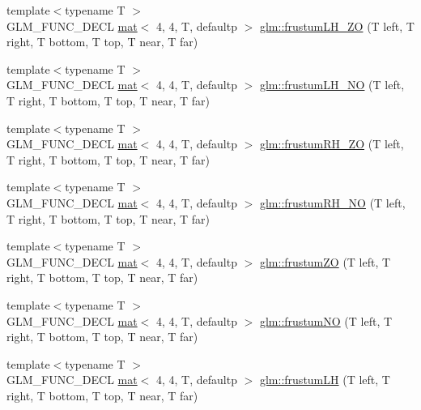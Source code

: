 \begin{DoxyCompactItemize}
\item 
{\footnotesize template$<$typename T $>$ }\\G\+L\+M\+\_\+\+F\+U\+N\+C\+\_\+\+D\+E\+CL \hyperlink{structglm_1_1mat}{mat}$<$ 4, 4, T, defaultp $>$ \hyperlink{group__gtc__matrix__transform_ga94218b094862d17798370242680b9030}{glm\+::frustum\+L\+H\+\_\+\+ZO} (T left, T right, T bottom, T top, T near, T far)
\item 
{\footnotesize template$<$typename T $>$ }\\G\+L\+M\+\_\+\+F\+U\+N\+C\+\_\+\+D\+E\+CL \hyperlink{structglm_1_1mat}{mat}$<$ 4, 4, T, defaultp $>$ \hyperlink{group__gtc__matrix__transform_ga259520cad03b3f8bca9417920035ed01}{glm\+::frustum\+L\+H\+\_\+\+NO} (T left, T right, T bottom, T top, T near, T far)
\item 
{\footnotesize template$<$typename T $>$ }\\G\+L\+M\+\_\+\+F\+U\+N\+C\+\_\+\+D\+E\+CL \hyperlink{structglm_1_1mat}{mat}$<$ 4, 4, T, defaultp $>$ \hyperlink{group__gtc__matrix__transform_ga7654a9227f14d5382786b9fc0eb5692d}{glm\+::frustum\+R\+H\+\_\+\+ZO} (T left, T right, T bottom, T top, T near, T far)
\item 
{\footnotesize template$<$typename T $>$ }\\G\+L\+M\+\_\+\+F\+U\+N\+C\+\_\+\+D\+E\+CL \hyperlink{structglm_1_1mat}{mat}$<$ 4, 4, T, defaultp $>$ \hyperlink{group__gtc__matrix__transform_ga9236c8439f21be186b79c97b588836b9}{glm\+::frustum\+R\+H\+\_\+\+NO} (T left, T right, T bottom, T top, T near, T far)
\item 
{\footnotesize template$<$typename T $>$ }\\G\+L\+M\+\_\+\+F\+U\+N\+C\+\_\+\+D\+E\+CL \hyperlink{structglm_1_1mat}{mat}$<$ 4, 4, T, defaultp $>$ \hyperlink{group__gtc__matrix__transform_gaa73322e152edf50cf30a6edac342a757}{glm\+::frustum\+ZO} (T left, T right, T bottom, T top, T near, T far)
\item 
{\footnotesize template$<$typename T $>$ }\\G\+L\+M\+\_\+\+F\+U\+N\+C\+\_\+\+D\+E\+CL \hyperlink{structglm_1_1mat}{mat}$<$ 4, 4, T, defaultp $>$ \hyperlink{group__gtc__matrix__transform_gae34ec664ad44860bf4b5ba631f0e0e90}{glm\+::frustum\+NO} (T left, T right, T bottom, T top, T near, T far)
\item 
{\footnotesize template$<$typename T $>$ }\\G\+L\+M\+\_\+\+F\+U\+N\+C\+\_\+\+D\+E\+CL \hyperlink{structglm_1_1mat}{mat}$<$ 4, 4, T, defaultp $>$ \hyperlink{group__gtc__matrix__transform_gae4277c37f61d81da01bc9db14ea90296}{glm\+::frustum\+LH} (T left, T right, T bottom, T top, T near, T far)

\end{DoxyCompactItemize}
